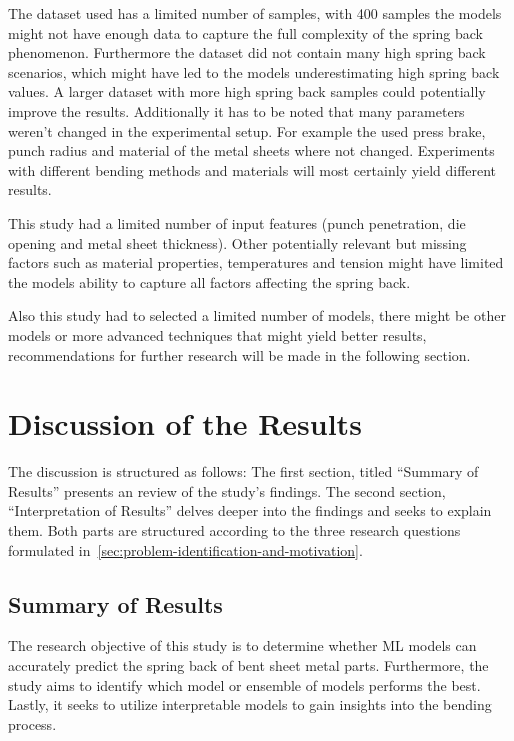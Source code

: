 The dataset used has a limited number of samples, with 400 samples the models might not have enough data to capture
the full complexity of the spring back phenomenon.
Furthermore the dataset did not contain many high spring back scenarios, which might have led to the models
underestimating high spring back values.
A larger dataset with more high spring back samples could potentially improve the results.
Additionally it has to be noted that many parameters weren't changed in the experimental setup.
For example the used press brake, punch radius and material of the metal sheets where not changed.
Experiments with different bending methods and materials will most certainly yield different results.

This study had a limited number of input features (punch penetration, die opening and
metal sheet thickness).
Other potentially relevant but missing factors such as material properties, temperatures and tension might have limited
the models ability to capture all factors affecting the spring back.

Also this study had to selected a limited number of models,
there might be other models or more advanced techniques that might yield better results, recommendations for further
research will be made in the following section.


\section{Discussion of the Results}\label{sec:results-and-discussion}
The discussion is structured as follows:
The first section, titled ``Summary of Results'' presents an review of the study's findings.
The second section, ``Interpretation of Results'' delves deeper into the findings and seeks to explain them.
Both parts are structured according to the three research questions formulated
in~\cref{sec:problem-identification-and-motivation}.

\subsection{Summary of Results}\label{subsec:summary-of-results}
The research objective of this study is to determine whether \ac{ML} models can accurately predict the spring
back of
bent sheet metal parts.
Furthermore, the study aims to identify which model or ensemble of models performs the best.
Lastly, it seeks to utilize interpretable models to gain insights into the bending process.

